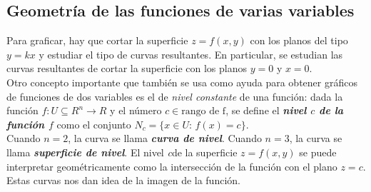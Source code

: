\documentclass[a4paper, twoside]{article}
\numberwithin{equation}{section}
\numberwithin{figure}{section}
\numberwithin{table}{section}
\begin{document}
\subsection{Geometría de las funciones de varias variables}

\begin{minipage}{0.5\textwidth}		
	Para graficar, hay que cortar la superficie $z=f(x,y)$ con los planos 
	del tipo $y=kx$ y estudiar el tipo de curvas resultantes.
	En particular, se estudian las curvas resultantes de cortar la superficie 
	con los planos $y=0$ y $x=0$. \\
	
	Otro concepto importante que también se usa como ayuda para obtener gráficos 
	de funciones de dos variables es el de \emph{nivel constante} de una función: 
	dada la función $f:U\subseteq R^n \rightarrow R$ y el número $c\in\mbox{rango de f}$, 
	se define el \emph{\textbf{nivel $c$ de la función $f$}} como el conjunto 
	$N_{c}=\{x\in U:\, f\left(x\right)=c\}.$ \\
	
	Cuando $n=2$, la curva se llama \textit{\textbf{curva de nivel}}. 
	Cuando $n=3$, la curva se llama \textit{\textbf{superficie de nivel}}. 
	El nivel \textit{c}de la superficie $z=f\left(x,y\right)$ se puede interpretar 
	geométricamente como la intersección de la función con el plano $z=c$. 
	Estas curvas nos dan idea de la imagen de la función.
\end{minipage}					
\end{document}
